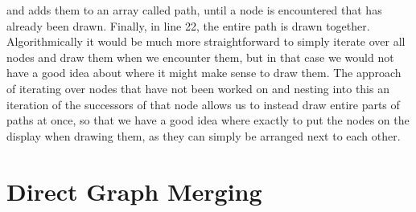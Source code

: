 \documentclass[a4paper,12pt,twoside,BCOR=10mm]{scrbook}
\begin{document}
and adds them to an array called path, until a node is encountered that has already been drawn.
Finally, in line 22, the entire path is drawn together. \\
Algorithmically it would be much more straightforward to simply iterate over all nodes
and draw them when we encounter them, but in that case we would not have a good idea about
where it might make sense to draw them. The approach of iterating over nodes
that have not been worked on and nesting into this an iteration of the successors of that node
allows us to instead draw entire parts of paths at once, so that we have a good idea
where exactly to put the nodes on the display when drawing them, as they can simply
be arranged next to each other.

\section{Direct Graph Merging}
\label{sec:direct_graph_merging}
\end{document}

